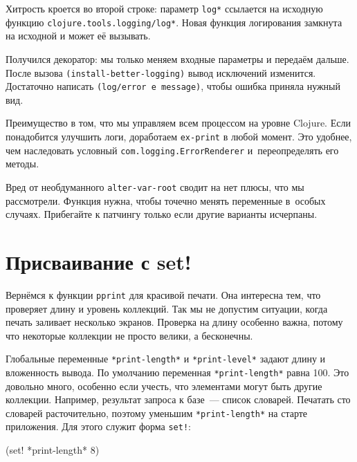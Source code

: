 \fi

Хитрость кроется во второй строке: параметр \verb|log*| ссылается на исходную
функцию \verb|clojure.tools.logging/log*|. Новая функция логирования замкнута на
исходной и может её вызывать.

Получился декоратор: мы только меняем входные параметры и передаём дальше. После
вызова \verb|(install-better-logging)| вывод исключений изменится. Достаточно
написать \texttt{(log/error e message)}, чтобы ошибка приняла нужный вид.

Преимущество в том, что мы управляем всем процессом на уровне Clojure. Если
понадобится улучшить логи, доработаем \verb|ex-print| в любой момент. Это
удобнее, чем наследовать условный \verb|com.logging.ErrorRenderer|
и~переопределять его методы.

Вред от необдуманного \verb|alter-var-root| сводит на нет плюсы, что мы
рассмотрели. Функция нужна, чтобы точечно менять переменные в~особых
случаях. Прибегайте к патчингу только если другие варианты исчерпаны.

\section{Присваивание с set!}


Вернёмся к функции \verb|pprint| для красивой печати. Она интересна тем, что
проверяет длину и уровень коллекций. Так мы не допустим ситуации, когда печать
заливает несколько экранов. Проверка на длину особенно важна, потому что
некоторые коллекции не просто велики, а бесконечны.


Глобальные переменные \verb|*print-length*| и \verb|*print-level*| задают длину
и вложенность вывода. По умолчанию переменная \verb|*print-length*| равна 100. Это довольно
много, особенно если учесть, что элементами могут быть другие
коллекции. Например, результат запроса к базе~--- список словарей. Печатать сто
словарей расточительно, поэтому уменьшим \verb|*print-length*| на старте
приложения. Для этого служит форма \verb|set!|:

\begin{english}
  \begin{clojure}
(set! *print-length* 8)
  \end{clojure}
\end{english}

